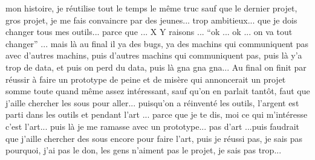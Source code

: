 mon histoire, je réutilise tout le temps le même truc sauf que le dernier projet, gros projet, je me fais convaincre par des jeunes... trop ambitieux... que je dois changer tous mes outils... parce que ... X Y raisons ... ``ok ... ok ... on va tout changer'' ... mais là au final il ya des bugs, ya des machins qui communiquent pas avec d'autres machins, puis d'autres machins qui communiquent pas, puis là y'a trop de data, et puis on perd du data, puis là gna gna gna... Au final on finit par réussir à faire un prototype de peine et de misère qui annoncerait un projet somme toute quand même assez intéressant, sauf qu'on en parlait tantôt, faut que j'aille chercher les sous pour aller... puisqu'on a réinventé les outils, l'argent est parti dans les outils et pendant l'art ... parce que je te dis, moi ce qui m'intéresse c'est l'art...  puis là je me ramasse avec un prototype... pas d'art ...puis faudrait que j'aille chercher des sous encore pour faire l'art, puis je réussi pas, je sais pas pourquoi, j'ai pas le don, les gens n'aiment pas le projet, je sais pas trop...










